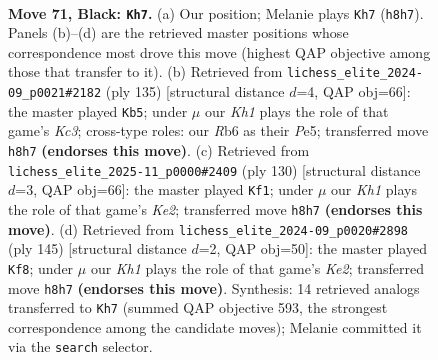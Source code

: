 \documentclass[11pt]{article}
\begin{document}
\clearpage

\begin{figure}[p]\centering
\begin{subfigure}{0.46\textwidth}\centering
\resizebox{\linewidth}{!}{%
\newchessgame
\chessboard[
  setfen={4R2k/8/1r6/8/5K2/8/7P/3r4 b - - 10 71},
  showmover=false,
  pgfstyle=straightmove, color=movearrow, markmove={h8-h7}
]}
\caption{}
\end{subfigure}\hfill
\begin{subfigure}{0.46\textwidth}\centering
\resizebox{\linewidth}{!}{%
\newchessgame
\chessboard[
  setfen={8/8/2k5/4p3/6r1/2R5/8/3K4 b - - 0 68},
  showmover=false,
  pgfstyle=straightmove, color=movearrow, markmove={c6-b5}
]}
\caption{}
\end{subfigure}
\\[4pt]
\begin{subfigure}{0.46\textwidth}\centering
\resizebox{\linewidth}{!}{%
\newchessgame
\chessboard[
  setfen={6R1/8/5p2/8/5k2/8/1r2K3/8 w - - 6 66},
  showmover=false,
  pgfstyle=straightmove, color=movearrow, markmove={e2-f1}
]}
\caption{}
\end{subfigure}\hfill
\begin{subfigure}{0.46\textwidth}\centering
\resizebox{\linewidth}{!}{%
\newchessgame
\chessboard[
  setfen={8/R3k3/6K1/8/5P2/8/8/2r5 b - - 32 73},
  showmover=false,
  pgfstyle=straightmove, color=movearrow, markmove={e7-f8}
]}
\caption{}
\end{subfigure}
\caption{\textbf{Move 71, Black: \texttt{Kh7}.} (a) Our position; Melanie plays \texttt{Kh7} (\texttt{h8h7}). Panels (b)--(d) are the retrieved master positions whose correspondence most drove this move (highest QAP objective among those that transfer to it). (b) Retrieved from \texttt{lichess\_elite\_2024-09\_p0021\#2182} (ply 135) [structural distance $d$=4, QAP obj=66]: the master played \texttt{Kb5}; under $\mu$ our \emph{Kh1} plays the role of that game's \emph{Kc3}; cross-type roles: our \emph{R}b6 as their \emph{P}e5; transferred move \texttt{h8h7} \textbf{(endorses this move)}. (c) Retrieved from \texttt{lichess\_elite\_2025-11\_p0000\#2409} (ply 130) [structural distance $d$=3, QAP obj=66]: the master played \texttt{Kf1}; under $\mu$ our \emph{Kh1} plays the role of that game's \emph{Ke2}; transferred move \texttt{h8h7} \textbf{(endorses this move)}. (d) Retrieved from \texttt{lichess\_elite\_2024-09\_p0020\#2898} (ply 145) [structural distance $d$=2, QAP obj=50]: the master played \texttt{Kf8}; under $\mu$ our \emph{Kh1} plays the role of that game's \emph{Ke2}; transferred move \texttt{h8h7} \textbf{(endorses this move)}. Synthesis: 14 retrieved analogs transferred to \texttt{Kh7} (summed QAP objective 593, the strongest correspondence among the candidate moves); Melanie committed it via the \texttt{search} selector.}
\label{fig:thought-m141}
\end{figure}
\end{document}
